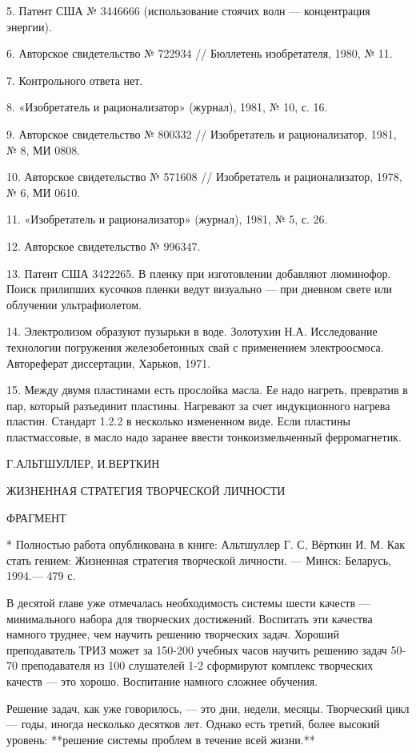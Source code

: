 5. Патент США № 3446666 (использование стоячих волн — концентрация энергии).

6. Авторское свидетельство № 722934 // Бюллетень изобретателя, 1980, № 11.

7. Контрольного ответа нет.

8. «Изобретатель и рационализатор» (журнал), 1981, № 10,
с. 16.

9. Авторское свидетельство № 800332 // Изобретатель и рационализатор, 1981, № 8, МИ 0808.


10. Авторское свидетельство № 571608 // Изобретатель и рационализатор, 1978, № 6, МИ 0610.

11. «Изобретатель и рационализатор» (журнал), 1981, № 5,
с. 26.

12. Авторское свидетельство № 996347.

13. Патент США 3422265. В пленку при изготовлении добавляют люминофор.
Поиск прилипших  кусочков пленки ведут  визуально — при  дневном свете
или облучении ультрафиолетом.

14. Электролизом образуют пузырьки в воде. Золотухин Н.А. Исследование
технологии погружения железобетонных свай с применением электроосмоса.
Автореферат диссертации, Харьков, 1971.

15.  Между двумя  пластинами есть  прослойка масла.  Ее надо  нагреть,
превратив  в  пар,  который  разъединит пластины.  Нагревают  за  счет
индукционного нагрева  пластин. Стандарт 1.2.2 в  несколько измененном
виде.  Если  пластины  пластмассовые,  в  масло  надо  заранее  ввести
тонкоизмельченный ферромагнетик.


Г.АЛЬТШУЛЛЕР, И.ВЕРТКИН

ЖИЗНЕННАЯ СТРАТЕГИЯ ТВОРЧЕСКОЙ ЛИЧНОСТИ

ФРАГМЕНТ

* Полностью работа  опубликована в книге: Альтшуллер Г.  С, Вёрткин И.
М. Как стать гением: Жизненная стратегия творческой личности. — Минск:
Беларусь, 1994.— 479 с.

В десятой главе  уже отмечалась необходимость системы  шести качеств —
минимального набора для творческих  достижений. Воспитать эти качества
намного  труднее,  чем  научить   решению  творческих  задач.  Хороший
преподаватель  ТРИЗ может  за  150-200 учебных  часов научить  решению
задач 50-70%
преподавателя  из 100  слушателей 1-2  сформируют комплекс  творческих
качеств — это хорошо. Воспитание намного сложнее обучения.

Решение  задач,  как  уже  говорилось,  —  это  дни,  недели,  месяцы.
Творческий цикл  — годы,  иногда несколько  десятков лет.  Однако есть
третий,  более высокий  уровень: **решение  системы проблем  в течение
всей жизни.**

